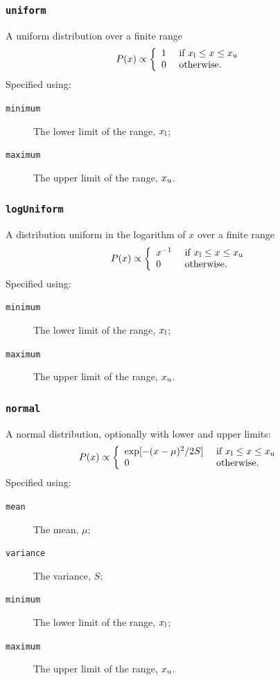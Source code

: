 \subsubsection{{\tt uniform}}

A uniform distribution over a finite range
\begin{equation}
P(x) \propto \left\{ \begin{array}{ll} 1 & \hbox{ if } x_{\rm l} \leq x \leq x_{\rm u} \\ 0 & \hbox{ otherwise.}  \end{array} \right.
\end{equation}
Specified using:
\begin{description}
\item[{\tt minimum}] The lower limit of the range, $x_{\rm l}$;
\item[{\tt maximum}] The upper limit of the range, $x_{\rm u}$.
\end{description}

\subsubsection{{\tt logUniform}}

A distribution uniform in the logarithm of $x$ over a finite range
\begin{equation}
P(x) \propto \left\{ \begin{array}{ll} x^{-1} & \hbox{ if } x_{\rm l} \leq x \leq x_{\rm u} \\ 0 & \hbox{ otherwise.}  \end{array} \right.
\end{equation}
Specified using:
\begin{description}
\item[{\tt minimum}] The lower limit of the range, $x_{\rm l}$;
\item[{\tt maximum}] The upper limit of the range, $x_{\rm u}$.
\end{description}

\subsubsection{{\tt normal}}

A normal distribution, optionally with lower and upper limits:
\begin{equation}
P(x) \propto \left\{ \begin{array}{ll} \exp[-(x-\mu)^2/2S] & \hbox{ if } x_{\rm l} \leq x \leq x_{\rm u} \\ 0 & \hbox{ otherwise.}  \end{array} \right.
\end{equation}
Specified using:
\begin{description}
\item[{\tt mean}] The mean, $\mu$;
\item[{\tt variance}] The variance, $S$;
\item[{\tt minimum}] The lower limit of the range, $x_{\rm l}$;
\item[{\tt maximum}] The upper limit of the range, $x_{\rm u}$.
\end{description}

